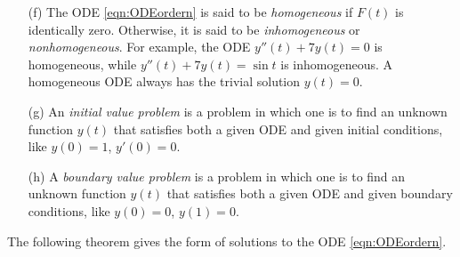 \addtocounter{theorem}{-1}
\begin{defn}[continued]
\begin{enumerate}[(a)]

\item[(f)] %
The ODE \eqref{eqn:ODEordern} is said to be \emph{homogeneous} if $F(t)$ 
is identically zero. Otherwise, it is said to be \emph{inhomogeneous} or 
\emph{nonhomogeneous}. For example, the ODE $y''(t)+7y(t)=0$ is homogeneous, 
while  $y''(t)+7y(t)=\sin t$ is inhomogeneous. A homogeneous ODE always
has the trivial solution $y(t)=0$.

\item[(g)] %
An \emph{initial value problem}  is a problem in which one is to find
an unknown function $y(t)$ that satisfies both a given ODE and given
initial conditions, like $y(0)=1$, $y'(0)=0$. 

\item[(h)] %
A \emph{boundary value problem}  is a problem in which one is to find
an unknown function $y(t)$ that satisfies both a given ODE and given
boundary conditions, like $y(0)=0$, $y(1)=0$. 

\end{enumerate}
\end{defn}


\noindent The following theorem gives the form of solutions to the ODE
\eqref{eqn:ODEordern}.

